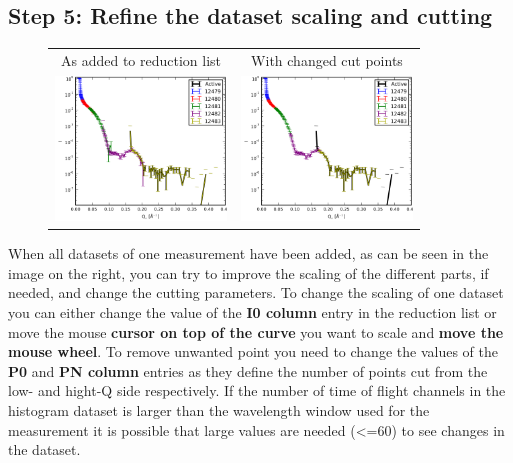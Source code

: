   \subsection{Step 5: Refine the dataset scaling and cutting}
  \label{sec:scaling}
    \begin{figure}
    \centering
    \begin{tabular}{cc}
       As added to reduction list& With changed cut points\\
     \includegraphics[width=129pt]{screenshots/stitching2.png} &
     \includegraphics[width=129pt]{screenshots/cleanpoints.png} 
    \end{tabular}
    \end{figure}
    When all datasets of one measurement have been added, as can be seen in the image on the right, you can try to improve the scaling of the different parts, if needed, and change the cutting parameters.
    To change the scaling of one dataset you can either change the value of the \textbf{I0 column} entry in the reduction list or move the mouse \textbf{cursor on top of the curve} you want to scale and \textbf{move the mouse wheel}.
    To remove unwanted point you need to change the values of the \textbf{P0} and \textbf{PN column} entries as they define the number of points cut from the low- and hight-Q side respectively.
    If the number of time of flight channels in the histogram dataset is larger than the wavelength window used for the measurement it is possible that large values are needed (<=60) to see changes in the dataset.
    
